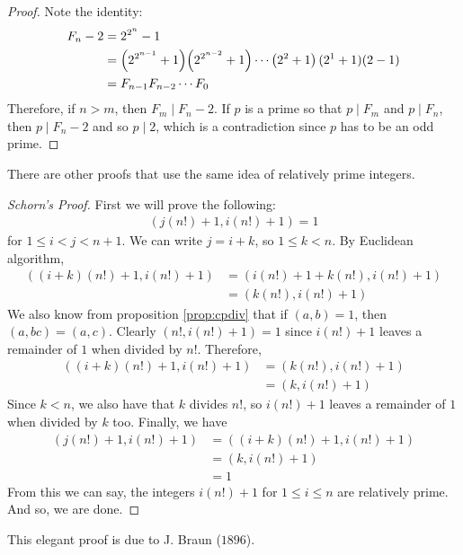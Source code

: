 \documentclass{subfiles}
\begin{document}
		\begin{proof}
			Note the identity:
			\begin{align*}
				F_n-2 & = 2^{2^n}-1\\
					  & = \func{}{2^{2^{n-1}}+1}\func{}{2^{2^{n-2}}+1}\cdots\left(2^2+1\right)(2^1+1)(2-1)\\
					  & = F_{n-1}F_{n-2}\cdots F_{0}
			\end{align*}
			Therefore, if $n>m$, then $F_m\mid F_n-2$. If $p$ is a prime so that $p\mid F_m$ and $p\mid F_n$, then $p\mid F_n-2$ and so $p\mid 2$, which is a contradiction since $p$ has to be an odd prime.
		\end{proof}
	There are other proofs that use the same idea of relatively prime integers.
		\begin{proof}[Schorn's Proof]
			First we will prove the following:
				\begin{align*}
					(j(n!)+1,i(n!)+1)=1
				\end{align*}
			for $1\leq i<j<n+1$. We can write $j=i+k$, so $1\leq k<n$. By Euclidean algorithm,
				\begin{align*}
					((i+k)(n!)+1,i(n!)+1) & = (i(n!)+1+k(n!),i(n!)+1)\\
										  & = (k(n!),i(n!)+1)
				\end{align*}
			We also know from proposition \eqref{prop:cpdiv} that if $(a,b)=1$, then $(a,bc)=(a,c)$. Clearly $(n!,i(n!)+1)=1$ since $i(n!)+1$ leaves a remainder of $1$ when divided by $n!$. Therefore,
				\begin{align*}
					((i+k)(n!)+1,i(n!)+1) & = (k(n!),i(n!)+1)\\
										  & = (k,i(n!)+1)
				\end{align*}
			Since $k<n$, we also have that $k$ divides $n!$, so $i(n!)+1$ leaves a remainder of $1$ when divided by $k$ too. Finally, we have
				\begin{align*}
					(j(n!)+1,i(n!)+1)
						& = ((i+k)(n!)+1,i(n!)+1)\\
						& = (k,i(n!)+1)\\
						& = 1
				\end{align*}
			From this we can say, the integers $i(n!)+1$ for $1\leq i\leq n$ are relatively prime. And so, we are done.
		\end{proof}
	This elegant proof is due to J. Braun ($1896$).
\end{document}
